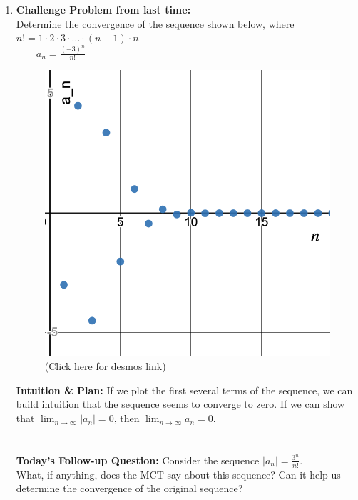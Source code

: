 \begin{enumerate}


\item \textbf{Challenge Problem from last time:}\\
 Determine the convergence of the sequence shown below, where \(n! = 1\cdot 2 \cdot 3 \cdot \ldots \cdot (n-1) \cdot n \)\\
 \(\qquad a_n =\frac{(-3)^n}{n!} \) \\
 
 
 \begin{figure}[!h]
 \centering
 \includegraphics[width=.6\textwidth]{Ch8s1-Challenge-Graph-a.png}
\caption{(Click \href{https://www.desmos.com/calculator/htfkvazzir}{here} for desmos link)}
 \end{figure}
 

  \textbf{Intuition \& Plan:} If we plot the first several terms of the sequence, we can build intuition that the sequence seems to converge to zero. If we can show that \(\lim_{n\rightarrow\infty} |a_n| = 0 \), then  \(\lim_{n\rightarrow\infty} a_n = 0\).
  ~\\~\\~\\
  
  \textbf{Today's Follow-up Question:} Consider the sequence  \( |a_n | =\frac{3^n}{n!} \).\\
 What, if anything, does the MCT say about this sequence? Can it help us determine the convergence of the original sequence?
  \vspace*{1in}
 


\end{enumerate}
